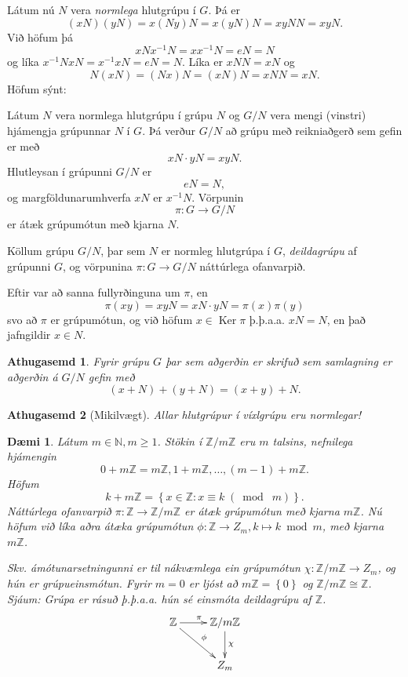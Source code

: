 \documentclass[a4paper,icelandic,11pt]{book}
\theoremstyle{plain}
\newtheorem{daemi}{Dæmi}[chapter]
\newtheorem*{ath}{Athugasemd}
\newcommand{\N}{\mathbb{N}}
\newcommand{\Z}{\mathbb{Z}}
\DeclareMathOperator{\Ker}{Ker} %
\begin{document}
Látum nú $N$ vera \emph{normlega} hlutgrúpu í $G$. Þá er 
\[
 (xN)(yN) = x(Ny)N = x(yN)N = xyNN = xyN.
\]
Við höfum þá
\[
xNx^{-1}N = xx^{-1}N = eN = N
\]
og líka $x^{-1}NxN = x^{-1}xN = eN = N$. Líka er $xNN = xN$ og 
\[
 N(xN) = (Nx)N = (xN)N = xNN = xN.
\]
Höfum sýnt:
\begin{setn}
  Látum $N$ vera normlega hlutgrúpu í grúpu $N$ og $G/N$ vera mengi (vinstri)
  hjámengja grúpunnar $N$ í $G$. Þá verður $G/N$ að grúpu með reikniaðgerð sem
  gefin er með
 \[
  xN \cdot yN = xyN.
 \]
  Hlutleysan í grúpunni $G/N$ er
 \[
  eN = N,
 \]
  og margföldunarumhverfa $xN$ er $x^{-1}N$. Vörpunin 
 \[
  \pi : G\to G/N
 \]
  er átæk grúpumótun með kjarna $N$.
\end{setn}
\begin{skilgr}
  Köllum grúpu $G/N$, þar sem $N$ er normleg hlutgrúpa í $G$,
  \emph{deildagrúpu}
  af grúpunni $G$, og vörpunina $\pi: G\to G/N$ náttúrlega ofanvarpið.
\end{skilgr}
Eftir var að sanna fullyrðinguna um $\pi$, en 
\[
 \pi(xy) = xyN = xN\cdot yN = \pi(x)\pi(y)
\]
svo að $\pi$ er grúpumótun, og við höfum $x\in \Ker \pi$ þ.þ.a.a. $xN = N$, en
það jafngildir $x\in N$.
\begin{ath}
  Fyrir grúpu $G$ þar sem aðgerðin er skrifuð sem samlagning er aðgerðin á
  $G/N$ gefin með
 \[
  (x+N) + (y+N) = (x+y)+N.
 \]
\end{ath}
\begin{ath}
  [Mikilvægt]
  Allar hlutgrúpur í \emph{víxl}grúpu eru normlegar!
\end{ath}
\begin{daemi}
  Látum $m\in \N, m\ge 1$. Stökin í $\Z / m\Z$ eru $m$ talsins, nefnilega
  hjámengin
 \[
  0 + m\Z = m\Z, 1+m\Z, \dots, (m-1) + m\Z.
 \]
 Höfum
 \[
 k + m\Z = \left\{ x\in \Z : x\equiv k \;(\bmod\;m) \right\}.
 \]
 Náttúrlega ofanvarpið $\pi: \Z \to \Z / m\Z$ er átæk grúpumótun með kjarna
 $m\Z$. Nú höfum við líka aðra átæka grúpumótun $\phi: \Z \to Z_m, k\mapsto
 k\bmod m$, með kjarna $m\Z$.

 Skv. \emph{ámótunarsetningunni} er til nákvæmlega ein grúpumótun $\chi: \Z / m\Z
 \to Z_m$, og hún er \emph{grúpueinsmótun}. Fyrir $m = 0$ er ljóst að $m\Z =
 \left\{ 0 \right\}$ og $\Z/m\Z \cong \Z$. Sjáum: Grúpa er rásuð þ.þ.a.a. hún sé
 einsmóta deildagrúpu af $\Z$.
\[
\xymatrix{
\Z\ar[r]^{\pi}\ar[dr]^{\phi} & \Z/m\Z\ar[d]^{\chi} \\
&Z_m
}
\]
\end{daemi}
\end{document}
